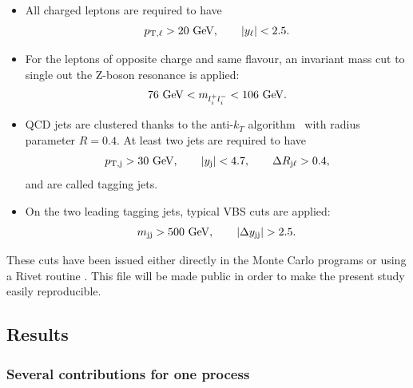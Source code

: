 \documentclass[11pt]{cernrep}
\begin{document}
\begin{itemize}
\item All charged leptons are required to have
    \begin{align}
        \label{cut:1}
         p_{\rm T, \ell} >  20{\rm~GeV},\qquad |y_{\ell}| < 2.5.
    \end{align}
\item For the leptons of opposite charge and same flavour, an invariant mass cut to single out the Z-boson resonance is applied:
    \begin{align}
        \label{cut:2}
         76 {\rm~GeV} < m_{l_i^+ l_i^-} < 106 {\rm~GeV}.
    \end{align}

\item QCD jets are clustered thanks to the anti-$k_T$ algorithm~\cite{Cacciari:2008gp} with radius parameter $R=0.4$.
      At least two jets are required to have
        \begin{align}
        \label{cut:3}
         p_{\rm T, j} >  30{\rm~GeV}, \qquad |y_{\rm j}| < 4.7, \qquad \Delta R_{\rm j \ell} > 0.4,
        \end{align}
        and are called tagging jets.
\item On the two leading tagging jets, typical VBS cuts are applied:
        \begin{align}
        \label{cut:4}
         m_{\rm j j} >  500{\rm~GeV},\qquad |\Delta y_{\rm j j}| > 2.5.
        \end{align}
\end{itemize}

These cuts have been issued either directly in the Monte Carlo programs or using a {\sc Rivet} routine \cite{Buckley:2010ar}.
This file will be made public in order to make the present study easily reproducible.

\subsection{Results \label{vbs_results}}

\subsubsection*{Several contributions for one process}
\end{document}
